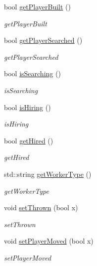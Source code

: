\begin{DoxyCompactItemize}
bool \hyperlink{class_game_1_1_game_event_handler_a30283da07c58c1de52d5a2ed61fd0577}{get\-Player\-Built} ()
\begin{DoxyCompactList}\small\item\em get\-Player\-Built \end{DoxyCompactList}\item 
bool \hyperlink{class_game_1_1_game_event_handler_ae08a601526a33a4416258d258976ed50}{get\-Player\-Searched} ()
\begin{DoxyCompactList}\small\item\em get\-Player\-Searched \end{DoxyCompactList}\item 
bool \hyperlink{class_game_1_1_game_event_handler_a603e124ff876bcad84bc3360124f707b}{is\-Searching} ()
\begin{DoxyCompactList}\small\item\em is\-Searching \end{DoxyCompactList}\item 
bool \hyperlink{class_game_1_1_game_event_handler_a32e3c3c3f8a7dc3d73befa8f899197cb}{is\-Hiring} ()
\begin{DoxyCompactList}\small\item\em is\-Hiring \end{DoxyCompactList}\item 
bool \hyperlink{class_game_1_1_game_event_handler_a158bbaf5035c67ea7b298e9962b8f55f}{get\-Hired} ()
\begin{DoxyCompactList}\small\item\em get\-Hired \end{DoxyCompactList}\item 
std\-::string \hyperlink{class_game_1_1_game_event_handler_ab485ab211069cdb82d912a05ff1cfe50}{get\-Worker\-Type} ()
\begin{DoxyCompactList}\small\item\em get\-Worker\-Type \end{DoxyCompactList}\item 
void \hyperlink{class_game_1_1_game_event_handler_ac3d2b6edba2a72379753ee6cf31d09d3}{set\-Thrown} (bool x)
\begin{DoxyCompactList}\small\item\em set\-Thrown \end{DoxyCompactList}\item 
void \hyperlink{class_game_1_1_game_event_handler_a1ebcaa75d732a1a65403d8abd34e4ce2}{set\-Player\-Moved} (bool x)
\begin{DoxyCompactList}\small\item\em set\-Player\-Moved \end{DoxyCompactList}\item 

\end{DoxyCompactItemize}
